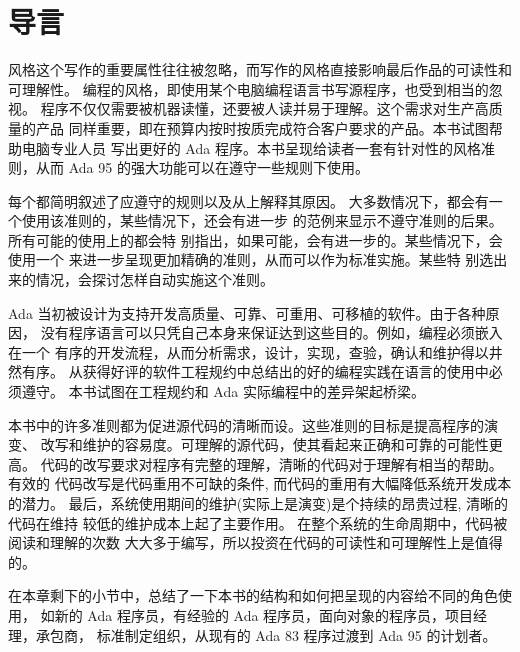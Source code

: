 %
%
%

\chapter{导言}
\label{c:introduction}
\pagestyle{fancy}

风格这个写作的重要属性往往被忽略，而写作的风格直接影响最后作品的可读性和
可理解性。 编程的风格，即使用某个电脑编程语言书写源程序，也受到相当的忽视。
程序不仅仅需要被机器读懂，还要被人读并易于理解。这个需求对生产高质量的产品
同样重要，即在预算内按时按质完成符合客户要求的产品。本书试图帮助电脑专业人员
写出更好的 Ada 程序。本书呈现给读者一套有针对性的风格准则，从而 Ada 95 
\cite{arm95}的强大功能可以在遵守一些规则下使用。

每个都简明叙述了应遵守的规则以及从上解释其原因。
大多数情况下，都会有一个使用该准则的，某些情况下，还会有进一步
的范例来显示不遵守准则的后果。所有可能的使用上的都会特
别指出，如果可能，会有进一步的。某些情况下，会使用一个
来进一步呈现更加精确的准则，从而可以作为标准实施。某些特
别选出来的情况，会探讨怎样自动实施这个准则。

Ada 当初被设计为支持开发高质量、可靠、可重用、可移植的软件。由于各种原因，
没有程序语言可以只凭自己本身来保证达到这些目的。例如，编程必须嵌入在一个
有序的开发流程，从而分析需求，设计，实现，查验，确认和维护得以井然有序。
从获得好评的软件工程规约中总结出的好的编程实践在语言的使用中必须遵守。
本书试图在工程规约和 Ada 实际编程中的差异架起桥梁。

本书中的许多准则都为促进源代码的清晰而设。这些准则的目标是提高程序的演变、
改写和维护的容易度。可理解的源代码，使其看起来正确和可靠的可能性更高。
代码的改写要求对程序有完整的理解，清晰的代码对于理解有相当的帮助。有效的
代码改写是代码重用不可缺的条件, 而代码的重用有大幅降低系统开发成本的潜力。
最后，系统使用期间的维护(实际上是演变)是个持续的昂贵过程, 清晰的代码在维持
较低的维护成本上起了主要作用。 在整个系统的生命周期中，代码被阅读和理解的次数
大大多于编写，所以投资在代码的可读性和可理解性上是值得的。

在本章剩下的小节中，总结了一下本书的结构和如何把呈现的内容给不同的角色使用，
如新的 Ada 程序员，有经验的 Ada 程序员，面向对象的程序员，项目经理，承包商，
标准制定组织，从现有的 Ada 83\cite{arm83} 程序过渡到 Ada 95 的计划者。
 
